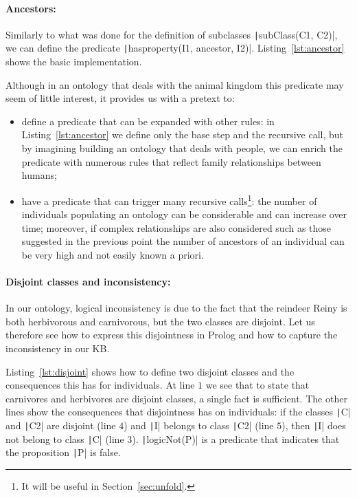 \paragraph{Ancestors:}  Similarly to what was done for the definition of subclasses \texttt|subClass(C1, C2)|, we can define the predicate \texttt|hasproperty(I1, ancestor, I2)|. Listing~\ref{lst:ancestor} shows the basic implementation. 

\begin{listingenv}[h]
	\caption{Ancestor definition}
	\label{lst:ancestor}
\end{listingenv}

Although in an ontology that deals with the animal kingdom this predicate may seem of little interest, it provides us with a pretext to:
\begin{itemize}
	\item define a predicate that can be expanded with other rules: in Listing~\ref{lst:ancestor} we define only the base step and the recursive call, but by imagining building an ontology that deals with people, we can enrich the predicate with numerous rules that reflect family relationships between humans;
	\item have a predicate that can trigger many recursive calls\footnote{It will be useful in Section~\ref{sec:unfold}.}: the number of individuals populating an ontology can be considerable and can increase over time; moreover, if complex relationships are also considered \textemdash{}such as those suggested in the previous point\textemdash{} the number of ancestors of an individual can be very high and not easily known a priori.
\end{itemize}

\paragraph{Disjoint classes and inconsistency:} In our ontology, logical inconsistency is due to the fact that the reindeer Reiny is both herbivorous and carnivorous, but the two classes are disjoint. Let us therefore see how to express this disjointness in Prolog and how to capture the inconsistency in our KB.

Listing~\ref{lst:disjoint} shows how to define two disjoint classes and the consequences this has for individuals. At line $1$ we see that to state that carnivores and herbivores are disjoint classes, a single fact is sufficient. The other lines show the consequences that disjointness has on individuals: if the classes \texttt|C| and \texttt|C2| are disjoint (line $4$) and \texttt|I| belongs to class \texttt|C2| (line $5$), then \texttt|I| does not belong to class \texttt|C| (line $3$). \texttt|logicNot(P)| is a predicate that indicates that the proposition \texttt|P| is false. 

